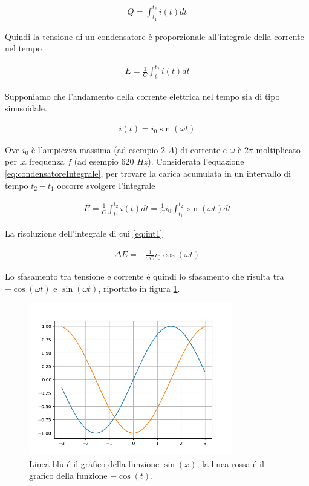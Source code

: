 \documentclass[17pt]{extarticle}
\begin{document}
\begin{enumerate}
\begin{eqnarray}
	Q = \int_{t_1}^{t_2}i(t)dt
\end{eqnarray}




Quindi la tensione di un condensatore è proporzionale all'integrale della corrente nel tempo

\begin{eqnarray}\label{eq:condensatoreIntegrale}
	E = \frac{1}{C}\int_{t_1}^{t_2}i(t)dt
\end{eqnarray}


Supponiamo che l'andamento della corrente elettrica nel tempo sia di tipo sinusoidale. 

\begin{eqnarray}
	i(t) =i_0\sin(\omega t)
\end{eqnarray}

Ove $i_0$ è l'ampiezza massima (ad esempio $2$ $A$) di corrente e $\omega$ è $2\pi$ moltiplicato per la frequenza $f$ (ad esempio $620$ $Hz$). Considerata l'equazione \ref{eq:condensatoreIntegrale}, per trovare la carica acumulata in un intervallo di tempo $t_2 - t_1$ occorre svolgere l'integrale

\begin{eqnarray}\label{eq:int1}
	E = \frac{1}{C} \int_{t_1}^{t_2}i(t)dt = \frac{1}{C}i_0\int_{t_1}^{t_2}\sin(\omega t)dt 
\end{eqnarray} 


La risoluzione dell'integrale di cui \ref{eq:int1}

\begin{eqnarray}\label{eq:ritFase}
	\Delta E = - \frac{1}{\omega C} i_0\cos(\omega t)
\end{eqnarray}


Lo sfasamento tra tensione e corrente è quindi lo sfasamento che risulta tra $-\cos(\omega t)$ e $\sin(\omega t)$, riportato in figura \ref{fig:sfasamento}.  


\begin{figure}[b!]		
	\centering
   	\includegraphics[width=3.5in]{sfasamento.png}
  	\caption{Linea blu \'e il grafico della funzione $\sin(x)$, la linea rossa \'e il grafico della funzione $-\cos(t)$.}
   	\label{fig:sfasamento}
\end{figure}%



\end{enumerate}
\end{document}

